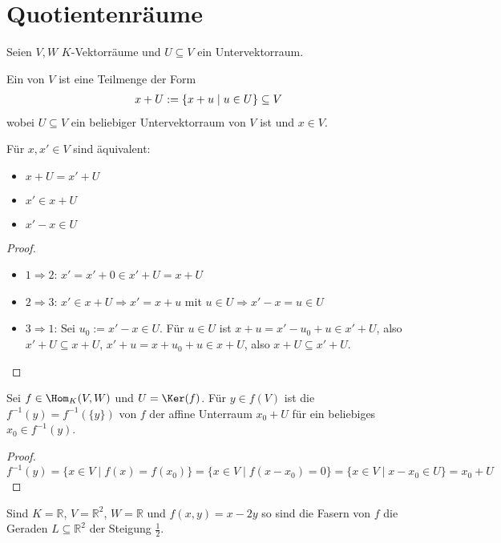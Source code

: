 \section{Quotientenräume}

Seien $V,W$ $K$-Vektorräume und $U\subseteq V$ ein Untervektorraum.

\begin{definition}
	Ein  von $V$ ist eine Teilmenge der Form 
	\begin{align}
		x+U:=\{x+u\mid u \in U\}\subseteq V\notag
	\end{align}
	wobei $U\subseteq V$ ein beliebiger Untervektorraum von $V$ ist und $x\in V$.
\end{definition}

\begin{lemma}
	Für $x,x'\in V$ sind äquivalent:
	\begin{itemize}
		\item $x+U=x'+U$
		\item $x'\in x+U$
		\item $x'-x\in U$
	\end{itemize}
\end{lemma}
\begin{proof}
	\begin{itemize}
		\item $1\Rightarrow 2$: $x'=x'+0\in x'+U=x+U$
		\item $2\Rightarrow 3$: $x'\in x+U \Rightarrow x'=x+u$ mit $u\in U\Rightarrow x'-x=u\in U$
		\item $3\Rightarrow 1$: Sei $u_0:=x'-x\in U$. Für $u\in U$ ist
		$x+u=x'-u_0+u\in x'+U$, also $x'+U\subseteq x+U$,
		$x'+u=x+u_0+u\in x+U$, also $x+U\subseteq x'+U$.
	\end{itemize}
\end{proof}

\begin{lemma}
	Sei $f\in \Hom_K(V,W)$ und $U=\Ker(f)$. Für $y\in f(V)$ ist die  $f^{-1}(y)=f^{-1}(\{y\})$ von $f$ der affine 
	Unterraum $x_0+U$ für ein beliebiges $x_0\in f^{-1}(y)$.
\end{lemma}
\begin{proof}
	$f^{-1}(y)=\{x\in V \mid f(x)=f(x_0)\}=\{x\in V \mid f(x-x_0)=0\} = \{x\in V \mid x-x_0\in U\}=x_0+U$
\end{proof}

\begin{example}
	Sind $K=\mathbb R$, $V=\mathbb R^2$, $W=\mathbb R$ und $f(x,y)=x-2y$ so sind die Fasern von $f$ die Geraden $L\subseteq 
	\mathbb R^2$ der Steigung $\frac 1 2$.
\end{example}

